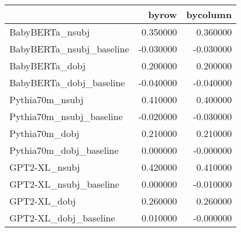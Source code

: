 \begin{tabular}{lrr}
\toprule
 & byrow & bycolumn \\
\midrule
BabyBERTa_nsubj & 0.350000 & 0.360000 \\
BabyBERTa_nsubj_baseline & -0.030000 & -0.030000 \\
BabyBERTa_dobj & 0.200000 & 0.200000 \\
BabyBERTa_dobj_baseline & -0.040000 & -0.040000 \\
Pythia70m_nsubj & 0.410000 & 0.400000 \\
Pythia70m_nsubj_baseline & -0.020000 & -0.030000 \\
Pythia70m_dobj & 0.210000 & 0.210000 \\
Pythia70m_dobj_baseline & 0.000000 & -0.000000 \\
GPT2-XL_nsubj & 0.420000 & 0.410000 \\
GPT2-XL_nsubj_baseline & 0.000000 & -0.010000 \\
GPT2-XL_dobj & 0.260000 & 0.260000 \\
GPT2-XL_dobj_baseline & 0.010000 & -0.000000 \\
\bottomrule
\end{tabular}
